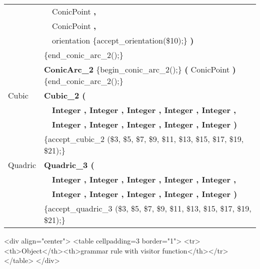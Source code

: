 \begin{ccTexOnly}
\begin{tabular}{*{2}{| l} |}
              & \ \ ConicPoint {\bf \Large ,}                    \\
              & \ \ ConicPoint {\bf \Large ,}                    \\
              & \ \ orientation \{accept\_orientation(\$10);\} {\bf \Large )}                  \\
              & \{end\_conic\_arc\_2();\}\\
              & {\bf ConicArc\_2} \{begin\_conic\_arc\_2();\} {\bf \Large (} ConicPoint {\bf \Large )} \{end\_conic\_arc\_2();\}\\ \hline
Cubic   & {\bf Cubic\_2 (}        \\
        & \ \ {\bf Integer , Integer , Integer , Integer , Integer ,} \\
        & \ \ {\bf Integer , Integer , Integer , Integer , Integer )}  \\
        & \{accept\_cubic\_2 (\$3, \$5, \$7, \$9, \$11, \$13, \$15, \$17, \$19, \$21);\}\\ \hline
Quadric & {\bf Quadric\_3 (}      \\
        & \ \ {\bf Integer , Integer , Integer , Integer , Integer ,}  \\
        & \ \ {\bf Integer , Integer , Integer , Integer , Integer )}                  \\ 
        & \{accept\_quadric\_3 (\$3, \$5, \$7, \$9, \$11, \$13, \$15, \$17, \$19, \$21);\}\\ \hline
\end{tabular}
\end{ccTexOnly}

\begin{ccHtmlOnly}
<div align="center">
<table cellpadding=3 border="1">
<tr><th>Object</th><th>grammar rule with visitor function</th></tr>
</table>
</div>
\end{ccHtmlOnly}
